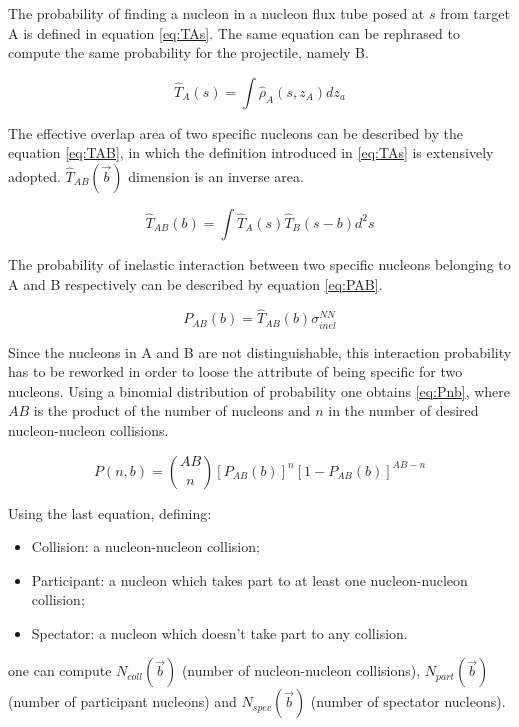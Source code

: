 The probability of finding a nucleon in a nucleon flux tube posed at $s$ from target A is defined in equation \ref{eq:TAs}.
The same equation can be rephrased to compute the same probability for the projectile, namely B.

\begin{equation}
\label{eq:TAs}
\hat{T}_A(s) = \int\hat{\rho}_A(s,z_A)dz_a
\end{equation}

The effective overlap area of two specific nucleons can be described by the equation \ref{eq:TAB}, in which the definition introduced in \ref{eq:TAs} is extensively adopted.
$\hat{T}_{AB}(\vec{b})$ dimension is an inverse area.

\begin{equation}
\label{eq:TAB}
\hat{T}_{AB}(b) = \int\hat{T}_A(s)\hat{T}_B(s-b)d^2s
\end{equation}

The probability of inelastic interaction between two specific nucleons belonging to A and B respectively can be described by equation \ref{eq:PAB}.

\begin{equation}
\label{eq:PAB}
P_{AB}(b)=\hat{T}_{AB}(b)\sigma_{inel}^{NN}
\end{equation}

Since the nucleons in A and B are not distinguishable, this interaction probability has to be reworked in order to loose the attribute of being specific for two nucleons.
Using a binomial distribution of probability one obtains \ref{eq:Pnb}, where $AB$ is the product of the number of nucleons and $n$ in the number of desired nucleon-nucleon collisions.

\begin{equation}
\label{eq:Pnb}
P(n,b)=\binom{AB}{n}[P_{AB}(b)]^n[1-P_{AB}(b)]^{AB-n}
\end{equation}

Using the last equation, defining:
\begin{itemize}
\item Collision: a nucleon-nucleon collision;
\item Participant: a nucleon which takes part to at least one nucleon-nucleon collision;
\item Spectator: a nucleon which doesn't take part to any collision.
\end{itemize}
one can compute $N_{coll}(\vec{b})$ (number of nucleon-nucleon collisions), $N_{part}(\vec{b})$ (number of participant nucleons) and $N_{spec}(\vec{b})$ (number of spectator nucleons).

